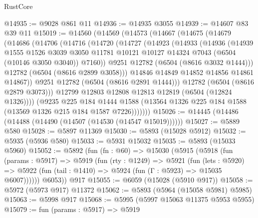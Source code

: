 \begin{lexlean}{RustCore}
\begin{coremodule}
@14935 := @9028 @861 @11
@14936 := @14935 @3055
@14939 := @14607 @83 @39 @11
@15019 := @14560
    (@14569
      (@14573
        (@14667
          (@14675
            (@14679
              (@14686
                (@14706
                  (@14716
                    (@14720
                      (@14727
                        (@14923
                          (@14933
                            (@14936
                              (@14939
                                @1555
                                @1526
                                @3039
                                @3050
                                @11781
                                @10121
                                @10127
                                @14324
                                @7043
                                (@6504 (@10146 @3050 @3040))
                                @7160))
                            @9251
                            @12782
                            (@6504 (@8616 @3032 @1444)))
                          @12782
                          (@6504 (@8616 @2899 @3058)))
                        @14846
                        @14849
                        @14852
                        @14856
                        @14861
                        @14867))
                    @9251
                    @12782
                    (@6504 (@8616 @2891 @1444)))
                  @12782
                  (@6504 (@8616 @2879 @3073)))
                @12799
                @12803
                @12808
                @12813
                @12819
                (@6504 (@12824 @1326))))
            (@9235
              @225
              @184
              @1444
              @1588
              (@13564 @1326 @225 @184 @1588 (@13569 @1326 @215 @184 @1587 @7226)))))))
@15026 := @14445 (@14486 (@14488 (@14490 (@14507 (@14530 (@14547 @15019))))))
@15027 := @5889 @580
@15028 := @5897 @11369
@15030 := @5893 (@15028 @5912)
@15032 := @5935 (@5936 @580)
@15033 := @5931 @15032
@15035 := @5893 (@15033 @5960)
@15052 := @5892
    (fun (fn : @60) =>
    @15030
      (@5915
        (@5918
          (fun (params : @5917) =>
          @5919
            (fun (rty : @1249) =>
            @5921
              (fun (lets : @5920) =>
              @5922 (fun (tail : @1410) => @5924 (fun (Γ : @5923) => @15035 @6007))))))
        @6053))
    @917
@15055 := @6059 (@15028 (@5910 @917))
@15058 := @5972 (@5973 @917) @11372
@15062 := @5893 (@5964 (@15058 @5981) @5985)
@15063 := @5998 @917
@15068 := @5995 (@5997 @15063 @11375 @5953 @5955)
@15079 := fun (params : @5917) =>
  @5919

\end{coremodule}
\end{lexlean}
